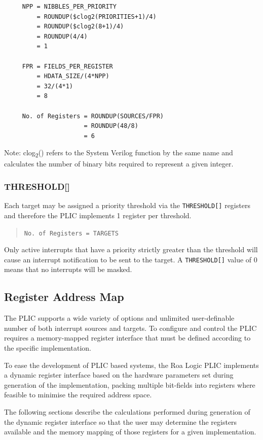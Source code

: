 \begin{verbatim}
     NPP = NIBBLES_PER_PRIORITY
         = ROUNDUP($clog2(PRIORITIES+1)/4)
         = ROUNDUP($clog2(8+1)/4)
         = ROUNDUP(4/4)
         = 1

     FPR = FIELDS_PER_REGISTER
         = HDATA_SIZE/(4*NPP)
         = 32/(4*1)
         = 8
    
     No. of Registers = ROUNDUP(SOURCES/FPR)
                      = ROUNDUP(48/8)
                      = 6
\end{verbatim}

Note: clog\textsubscript{2}() refers to the System Verilog function by the same name and calculates the number of binary bits required to represent a given integer.

\subsubsection{THRESHOLD[]}

Each target may be assigned a priority threshold via the
\texttt{THRESHOLD[]} registers and therefore the PLIC
implements 1 register per threshold. 

\begin{quote}
	\texttt{No.\ of\ Registers\ =\ TARGETS}
\end{quote}

Only active interrupts that have a priority strictly greater than the
threshold will cause an interrupt notification to be sent to the target.
A \texttt{THRESHOLD[]} value of 0 means that no interrupts will be masked.

\subsection{Register Address Map}

The PLIC supports a wide variety of options and unlimited user-definable
number of both interrupt sources and targets. To configure and control
the PLIC requires a memory-mapped register interface that must be
defined according to the specific implementation.

To ease the development of PLIC based systems, the Roa Logic PLIC
implements a dynamic register interface based on the hardware parameters
set during generation of the implementation, packing multiple bit-fields
into registers where feasible to minimise the required address space.

The following sections describe the calculations performed during
generation of the dynamic register interface so that the user may
determine the registers available and the memory mapping of those
registers for a given implementation.

